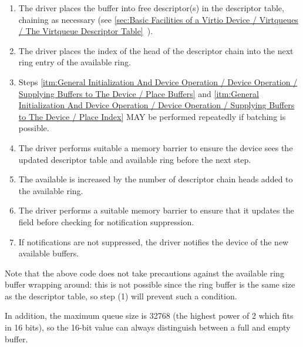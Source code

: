 \begin{enumerate}
\item\label{itm:General Initialization And Device Operation / Device Operation / Supplying Buffers to The Device / Place Buffers} The driver places the buffer into free descriptor(s) in the
   descriptor table, chaining as necessary (see \ref{sec:Basic Facilities of a Virtio Device / Virtqueues / The Virtqueue Descriptor Table}~).

\item\label{itm:General Initialization And Device Operation / Device Operation / Supplying Buffers to The Device / Place Index} The driver places the index of the head of the descriptor chain
   into the next ring entry of the available ring.

\item Steps \ref{itm:General Initialization And Device Operation / Device Operation / Supplying Buffers to The Device / Place Buffers} and \ref{itm:General Initialization And Device Operation / Device Operation / Supplying Buffers to The Device / Place Index} MAY be performed repeatedly if batching
  is possible.

\item The driver performs suitable a memory barrier to ensure the device sees
  the updated descriptor table and available ring before the next
  step.

\item The available  is increased by the number of
  descriptor chain heads added to the available ring.

\item The driver performs a suitable memory barrier to ensure that it updates
  the  field before checking for notification suppression.

\item If notifications are not suppressed, the driver notifies the device
    of the new available buffers.
\end{enumerate}

Note that the above code does not take precautions against the
available ring buffer wrapping around: this is not possible since
the ring buffer is the same size as the descriptor table, so step
(1) will prevent such a condition.

In addition, the maximum queue size is 32768 (the highest power
of 2 which fits in 16 bits), so the 16-bit  value can always
distinguish between a full and empty buffer.

